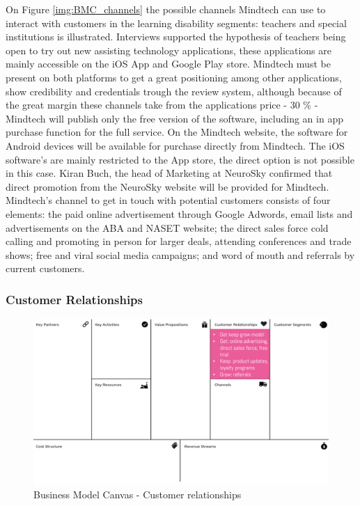 \documentclass[letterpaper,10pt]{article}
\begin{document}
On Figure \ref{img:BMC_channels} the possible channels Mindtech can use to interact with customers in the learning disability segments: teachers and special institutions is illustrated. Interviews supported the hypothesis of teachers being open to try out new assisting technology applications, these applications are mainly accessible on the iOS App and Google Play store. Mindtech must be present on both platforms to get a great positioning among other applications, show credibility and credentials trough the review system, although because of the great margin these channels take from the applications price - 30 \% - Mindtech will publish only the free version of the software, including an in app purchase function for the full service. On the Mindtech website, the software for Android devices will be available for purchase directly from Mindtech. The iOS software's are mainly restricted to the App store, the direct option is not possible in this case. Kiran Buch, the head of Marketing at NeuroSky confirmed that direct promotion from the NeuroSky website will be provided for Mindtech. 
Mindtech's channel to get in touch with potential customers consists of four elements: the paid online advertisement through Google Adwords, email lists and advertisements on the ABA and NASET website; the direct sales force cold calling and promoting in person for larger deals, attending conferences and trade shows; free and viral social media campaigns; and word of mouth and referrals by current customers. 


\subsubsection{Customer Relationships}

\begin{figure}[!htb]
\centering
\includegraphics[scale=0.5]{rel.PNG}
\caption{Business Model Canvas - Customer relationships}
\label{img:BMC_custrel}
\end{figure}
\end{document}
